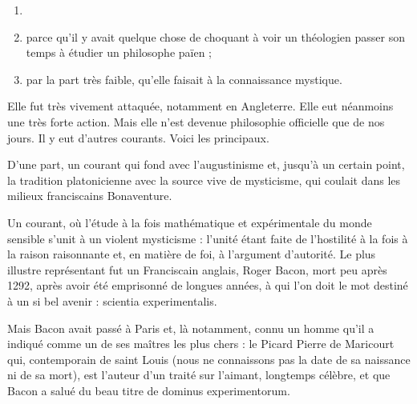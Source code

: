 \documentclass[french,twoside]{book} %
\begin{document}
\begin{enumerate}[itemsep=0pt,]
\item[] \hspace{-1.5em}{\bfseries Il faut bien observer que cette philosophie parut très vivement révolutionnaire :}
\item parce qu’il y avait quelque chose de choquant à voir un théologien passer son temps à étudier un philosophe païen ;
\label{p121}\item par la part très faible, qu’elle faisait à la connaissance mystique.

\end{enumerate}\noindent Elle fut très vivement attaquée, notamment en Angleterre. Elle eut néanmoins une très forte action. Mais elle n’est devenue philosophie officielle que de nos jours. Il y eut d’autres courants. Voici les principaux.\par
D’une part, un courant qui fond avec l’augustinisme et, jusqu’à un certain point, la tradition platonicienne avec la source vive de mysticisme, qui coulait dans les milieux franciscains Bonaventure.\par
Un courant, où l’étude à la fois mathématique et expérimentale du monde sensible s’unit à un violent mysticisme : l’unité étant faite de l’hostilité à la fois à la raison raisonnante et, en matière de foi, à l’argument d’autorité. Le plus illustre représentant fut un Franciscain anglais, Roger Bacon, mort peu après 1292, après avoir été emprisonné de longues années, à qui l’on doit le mot destiné à un si bel avenir : {\foreign scientia experimentalis}.\par
Mais Bacon avait passé à Paris et, là notamment, connu un homme qu’il a indiqué comme un de ses maîtres les plus chers : le Picard Pierre de Maricourt qui, contemporain de saint Louis (nous ne connaissons pas la date de sa naissance ni de sa mort), est l’auteur d’un traité sur l’aimant, longtemps célèbre, et que Bacon a salué du beau titre de {\foreign dominus experimentorum}.\par
\end{document}
